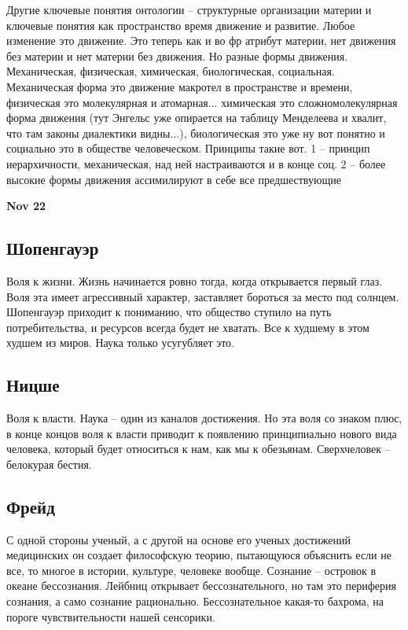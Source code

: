 \documentclass[a4paper, 12pt]{article}
\begin{document}
Другие ключевые понятия онтологии -- структурные организации материи 
и ключевые понятия как пространство время движение и развитие. Любое 
изменение это движение. Это теперь как и во фр атрибут материи, нет 
движения без материи и нет материи без движения. Но разные формы 
движения. Механическая, физическая, химическая, биологическая, 
социальная. Механическая форма это движение макротел в пространстве 
и времени, физическая это молекулярная и атомарная... химическая это 
сложномолекулярная форма движения (тут Энгельс уже опирается на таблицу 
Менделеева и хвалит, что там законы диалектики видны...), биологическая 
это уже ну вот понятно и социально это в обществе человеческом. Принципы 
такие вот. 1 -- принцип иерархичности, механическая, над ней 
настраиваются и в конце соц. 2 -- более высокие формы движения 
ассимилируют в себе все предшествующие 

\hfill \textbf{Nov 22}


\subsection{Шопенгауэр}

Воля к жизни. Жизнь начинается ровно тогда, когда открывается первый 
глаз. Воля эта имеет агрессивный характер, заставляет бороться за место 
под солнцем. Шопенгауэр приходит к пониманию, что общество ступило на 
путь потребительства, и ресурсов всегда будет не хватать. Все к худшему 
в этом худшем из миров. Наука только усугубляет это.


\subsection{Ницше}

Воля к власти. Наука -- один из каналов достижения. Но эта воля со 
знаком плюс, в конце концов воля к власти приводит к появлению 
принципиально нового вида человека, который будет относиться к нам, как 
мы к обезьянам. Сверхчеловек -- белокурая бестия.


\subsection{Фрейд}

С одной стороны ученый, а с другой на основе его ученых достижений 
медицинских он создает философскую теорию, пытающуюся объяснить если не 
все, то многое в истории, культуре, человеке вообще. Сознание -- 
островок в океане бессознания. Лейбниц открывает бессознательного, но 
там это периферия сознания, а само сознание рационально. Бессознательное 
какая-то бахрома, на пороге чувствительности нашей сенсорики.
\end{document}
